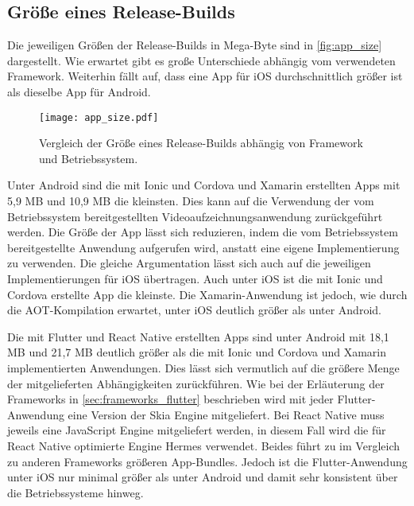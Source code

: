 \subsection{Größe eines Release-Builds}

Die jeweiligen Größen der Release-Builds in Mega-Byte sind in \autoref{fig:app_size} dargestellt.
Wie erwartet gibt es große Unterschiede abhängig vom verwendeten Framework.
Weiterhin fällt auf, dass eine App für iOS durchschnittlich größer ist als dieselbe App für Android.
\begin{figure}[ht]
  \centering 
  \texttt{[image: app\_size.pdf]}
  \caption{Vergleich der Größe eines Release-Builds abhängig von Framework und Betriebssystem.}
  \label{fig:app_size}
\end{figure}

Unter Android sind die mit Ionic und Cordova und Xamarin erstellten Apps mit 5,9 MB und 10,9 MB die kleinsten.
Dies kann auf die Verwendung der vom Betriebssystem bereitgestellten Videoaufzeichnungsanwendung zurückgeführt werden.
Die Größe der App lässt sich reduzieren, indem die vom Betriebssystem bereitgestellte Anwendung aufgerufen wird, anstatt eine eigene Implementierung zu verwenden.
Die gleiche Argumentation lässt sich auch auf die jeweiligen Implementierungen für iOS übertragen.
Auch unter iOS ist die mit Ionic und Cordova erstellte App die kleinste.
Die Xamarin-Anwendung ist jedoch, wie durch die \ac{AOT}-Kompilation erwartet, unter iOS deutlich größer als unter Android.

Die mit Flutter und React Native erstellten Apps sind unter Android mit 18,1 MB und 21,7 MB deutlich größer als die mit Ionic und Cordova und Xamarin implementierten Anwendungen.
Dies lässt sich vermutlich auf die größere Menge der mitgelieferten Abhängigkeiten zurückführen.
Wie bei der Erläuterung der Frameworks in \autoref{sec:frameworks_flutter} beschrieben wird mit jeder Flutter-Anwendung eine Version der Skia Engine mitgeliefert.
Bei React Native muss jeweils eine JavaScript Engine mitgeliefert werden, in diesem Fall wird die für React Native optimierte Engine Hermes verwendet.
Beides führt zu im Vergleich zu anderen Frameworks größeren App-Bundles.
Jedoch ist die Flutter-Anwendung unter iOS nur minimal größer als unter Android und damit sehr konsistent über die Betriebssysteme hinweg.

